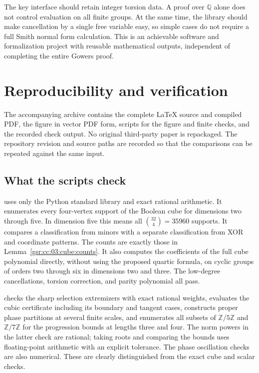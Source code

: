 \documentclass[11pt,letterpaper]{article}
\numberwithin{equation}{section}
\theoremstyle{definition}
\theoremstyle{remark}
\newcommand{\Z}{\mathbb Z}
\newcommand{\Q}{\mathbb Q}
\newcommand{\1}{\mathbf 1}
\newcommand{\srctag}[1]{\texorpdfstring{\enspace\textup{[#1]}}{ [#1]}}
\newcommand{\srcnote}[2]{\par\noindent{\small\textit{Source #1, delivered #2.}}\par}
\begin{document}
The key interface should retain integer torsion data. A proof over
$\Q$ alone does not control evaluation on all finite groups. At the same
time, the library should make cancellation by a single free variable
easy, so simple cases do not require a full Smith normal form calculation.
This is an achievable software and formalization project with reusable
mathematical outputs, independent of completing the entire Gowers proof.

\section[{Reproducibility and verification\srctag{03}}]{Reproducibility and verification}\label{gsr:fz:03:sec:dA}
\srcnote{03}{Appendix A}
\label{gsr:fz:03:appendix:checks}

The accompanying archive contains the complete LaTeX source and compiled
PDF, the figure in vector PDF form, scripts for the figure and finite
checks, and the recorded check output. No original third-party paper is
repackaged. The repository revision and source paths are recorded so that
the comparisons can be repeated against the same input.

\subsection{What the scripts check}

 uses only the Python standard library and exact
rational arithmetic. It enumerates every four-vertex support of the
Boolean cube for dimensions two through five. In dimension five this
means all $\binom{32}{4}=35960$ supports. It compares a classification
from minors with a separate classification from XOR and coordinate
patterns. The counts are exactly those in Lemma~\ref{gsr:cc:03:cube:counts}.
It also computes the coefficients of the full cube polynomial directly,
without using the proposed quartic formula, on cyclic groups of orders
two through six in dimensions two and three. The low-degree
cancellations, torsion correction, and parity polynomial all pass.

 checks the sharp selection extremizers with
exact rational weights, evaluates the cubic certificate including its
boundary and tangent cases, constructs proper phase partitions at
several finite scales, and enumerates all subsets of $\Z/5\Z$ and
$\Z/7\Z$ for the progression bounds at lengths three and four.
The norm powers in the latter check are rational; taking roots and
comparing the bounds uses floating-point arithmetic with an explicit
tolerance. The phase oscillation checks are also numerical. These are
clearly distinguished from the exact cube and scalar checks.
\end{document}
